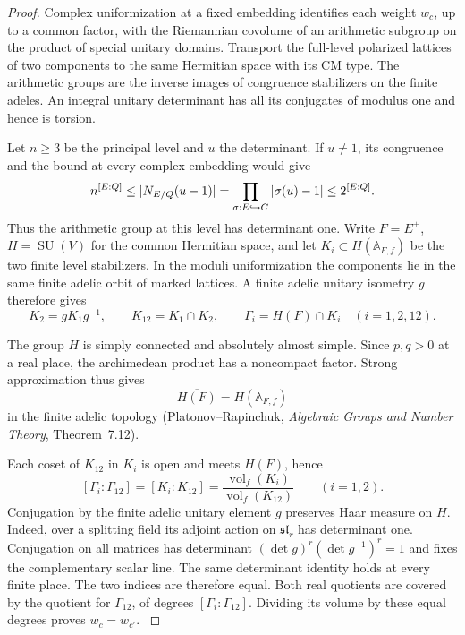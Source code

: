 \begin{proof}
Complex uniformization at a fixed embedding identifies each
weight \(w_c\), up to a common factor, with the Riemannian
covolume of an arithmetic subgroup on the product of special
unitary domains. Transport the full-level polarized lattices
of two components to the same Hermitian space with its CM type.
The arithmetic groups are the inverse images of congruence
stabilizers on the finite adeles. An integral unitary
determinant has all its conjugates of modulus one and hence
is torsion.

Let \(n\ge3\) be the principal level and \(u\) the determinant.
If \(u\ne1\), its congruence and the bound at every complex embedding
would give
\[
 n^{[E:Q]}\le |N_{E/Q}(u-1)|
       =\prod_{\sigma:E\hookrightarrow C}|\sigma(u)-1|
       \le 2^{[E:Q]} .
\]
Thus the arithmetic group at this level has determinant one.
Write \(F=E^+\), \(H=\operatorname{SU}(V)\) for the common
Hermitian space, and let \(K_i\subset H(\mathbb A_{F,f})\) be
the two finite level stabilizers. In the moduli uniformization
the components lie in the same finite adelic orbit of marked
lattices. A finite adelic unitary isometry \(g\) therefore gives
\[
 K_2=gK_1g^{-1},\qquad K_{12}=K_1\cap K_2,\qquad
 \Gamma_i=H(F)\cap K_i\quad(i=1,2,12).
\]
\label{cor:covolume-component-transfer-1}

The group \(H\) is simply connected and absolutely almost
simple. Since \(p,q>0\) at a real place, the archimedean product
has a noncompact factor. Strong approximation thus gives
\[
         \overline{H(F)}=H(\mathbb A_{F,f})
\]
in the finite adelic topology (Platonov--Rapinchuk,
\emph{Algebraic Groups and Number Theory}, Theorem~7.12).
\cite[the strong approximation theorem]{milne-pel-period-domain}

Each coset of \(K_{12}\) in \(K_i\) is open
and meets \(H(F)\), hence
\[
 [\Gamma_i:\Gamma_{12}]=[K_i:K_{12}]
    =\frac{\operatorname{vol}_f(K_i)}{\operatorname{vol}_f(K_{12})}
      \qquad(i=1,2).
\]
Conjugation by the finite adelic unitary element \(g\) preserves
Haar measure on \(H\). Indeed, over a splitting field its adjoint
action on \(\mathfrak{sl}_r\) has determinant one. Conjugation on
all matrices has determinant \((\det g)^r(\det g^{-1})^r=1\)
and fixes the complementary scalar line. The same determinant
identity holds at every finite place. The two indices are therefore
equal. Both real quotients are covered by the quotient for
\(\Gamma_{12}\), of degrees \([\Gamma_i:\Gamma_{12}]\).
Dividing its volume by these equal degrees proves \(w_c=w_{c'}\).
\label{cor:covolume-component-transfer-2}

\end{proof}

